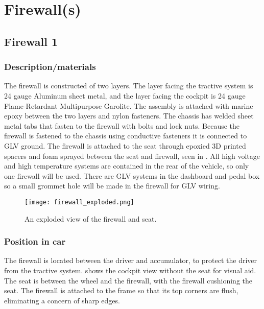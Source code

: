 \documentclass{article}
\begin{document}
\section{Firewall(s)}\label{firewalls}
\subsection{Firewall 1}\label{firewall_1}
\subsubsection{Description/materials}
The firewall is constructed of two layers. The layer facing the tractive system is 24 gauge Aluminum sheet metal, and the layer facing the cockpit is 24 gauge Flame-Retardant Multipurpose Garolite. The assembly is attached with marine epoxy between the two layers and nylon fasteners. The chassis has welded sheet metal tabs that fasten to the firewall with bolts and lock nuts. Because the firewall is fastened to the chassis using conductive fasteners it is connected to GLV ground. The firewall is attached to the seat through epoxied 3D printed spacers and foam sprayed between the seat and firewall, seen in .
All high voltage and high temperature systems are contained in the rear of the vehicle, so only one firewall will be used. There are GLV systems in the dashboard and pedal box so a small grommet hole will be made in the firewall for GLV wiring.

\begin{figure}[H]
    \centering
    \texttt{[image: firewall\_exploded.png]}
    \caption{An exploded view of the firewall and seat. }
    \label{fig:firewall_exploded}
\end{figure}

\subsubsection{Position in car}
The firewall is located between the driver and accumulator, to protect the driver from the tractive system.  shows the cockpit view without the seat for visual aid. The seat is between the wheel and the firewall, with the firewall cushioning the seat.  The firewall is attached to the frame so that its top corners are flush, eliminating a concern of sharp edges.
\end{document}
